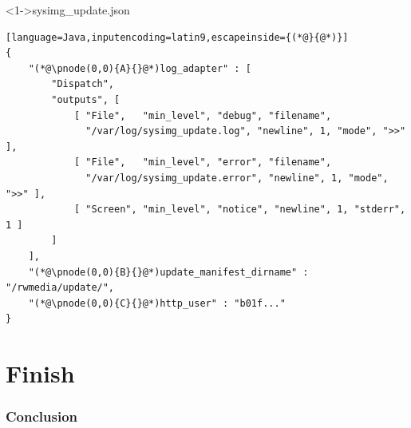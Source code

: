 \documentclass[ngerman,xcolor={table,dvipsnames},smaller,compress,hyperref={bookmarks,colorlinks}]{beamer}%
\begin{document}
\begin{frame}[t,fragile]

\begin{block}<1->{sysimg\_update.json}
\scriptsize
\begin{lstlisting}[language=Java,inputencoding=latin9,escapeinside={(*@}{@*)}]
{
    "(*@\pnode(0,0){A}{}@*)log_adapter" : [
        "Dispatch",
        "outputs", [
            [ "File",   "min_level", "debug", "filename",
              "/var/log/sysimg_update.log", "newline", 1, "mode", ">>" ],
            [ "File",   "min_level", "error", "filename",
              "/var/log/sysimg_update.error", "newline", 1, "mode", ">>" ],
            [ "Screen", "min_level", "notice", "newline", 1, "stderr", 1 ]
        ]
    ],
    "(*@\pnode(0,0){B}{}@*)update_manifest_dirname" : "/rwmedia/update/",
    "(*@\pnode(0,0){C}{}@*)http_user" : "b01f..."
}
\end{lstlisting}
\end{block}

\begin{itemize}
\end{itemize}


\end{frame}
\part{Finish}

\section{Conclusion}
\end{document}
